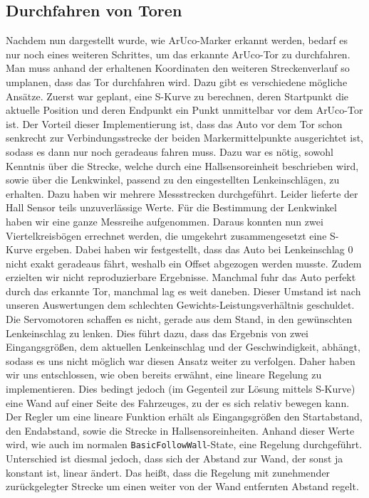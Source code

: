 \subsection{Durchfahren von Toren}
Nachdem nun dargestellt wurde, wie ArUco-Marker erkannt werden, bedarf es nur noch eines weiteren Schrittes, um das erkannte ArUco-Tor zu durchfahren. Man muss anhand der erhaltenen Koordinaten den weiteren Streckenverlauf so umplanen, dass das Tor durchfahren wird. 
\newline
Dazu gibt es verschiedene mögliche Ansätze. Zuerst war geplant, eine S-Kurve zu berechnen, deren Startpunkt die aktuelle Position und deren Endpunkt ein Punkt unmittelbar vor dem ArUco-Tor ist. Der Vorteil dieser Implementierung ist, dass das Auto vor dem Tor schon senkrecht zur Verbindungsstrecke der beiden Markermittelpunkte ausgerichtet ist, sodass es dann nur noch geradeaus fahren muss. Dazu war es nötig, sowohl Kenntnis über die Strecke, welche durch eine Hallsensoreinheit beschrieben wird, sowie über die Lenkwinkel, passend zu den eingestellten Lenkeinschlägen, zu erhalten. Dazu haben wir mehrere Messstrecken durchgeführt. Leider lieferte der Hall Sensor teils unzuverlässige Werte. Für die Bestimmung der Lenkwinkel haben wir eine ganze Messreihe aufgenommen. Daraus konnten nun zwei Viertelkreisbögen errechnet werden, die umgekehrt zusammengesetzt eine S-Kurve ergeben. Dabei haben wir festgestellt, dass das Auto bei Lenkeinschlag 0 nicht exakt geradeaus fährt, weshalb ein Offset abgezogen werden musste. Zudem erzielten wir nicht reproduzierbare Ergebnisse. Manchmal fuhr das Auto perfekt durch das erkannte Tor, manchmal lag es weit daneben. Dieser Umstand ist nach unseren Auswertungen dem schlechten Gewichts-Leistungsverhältnis geschuldet. Die Servomotoren schaffen es nicht, gerade aus dem Stand, in den gewünschten Lenkeinschlag zu lenken. Dies führt dazu, dass das Ergebnis von zwei Eingangsgrößen, dem aktuellen Lenkeinschlag und der Geschwindigkeit, abhängt, sodass es uns nicht möglich war diesen Ansatz weiter zu verfolgen. 
\newline
\newline
Daher haben wir uns entschlossen, wie oben bereits erwähnt, eine lineare Regelung zu implementieren. Dies bedingt jedoch (im Gegenteil zur Lösung mittels S-Kurve) eine Wand auf einer Seite des Fahrzeuges, zu der es sich relativ bewegen kann. 
\newline
\newline
Der Regler um eine lineare Funktion erhält als Eingangsgrößen den Startabstand, den Endabstand, sowie die Strecke in Hallsensoreinheiten. Anhand dieser Werte wird, wie auch im normalen \texttt{BasicFollowWall}-State, eine Regelung durchgeführt. Unterschied ist diesmal jedoch, dass sich der Abstand zur Wand, der sonst ja konstant ist, linear ändert. Das heißt, dass die Regelung mit zunehmender zurückgelegter Strecke um einen weiter von der Wand entfernten Abstand regelt. 
